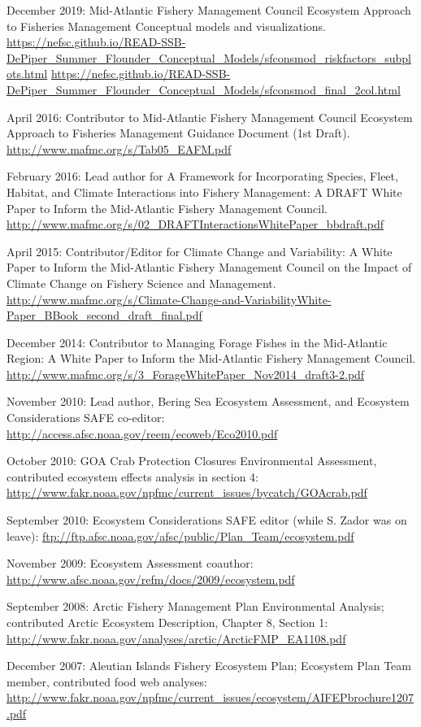\documentclass[11pt, a4paper]{awesome-cv}
\begin{document}
December 2019: Mid-Atlantic Fishery Management Council Ecosystem
Approach to Fisheries Management Conceptual models and visualizations.
\url{https://nefsc.github.io/READ-SSB-DePiper_Summer_Flounder_Conceptual_Models/sfconsmod_riskfactors_subplots.html}
\url{https://nefsc.github.io/READ-SSB-DePiper_Summer_Flounder_Conceptual_Models/sfconsmod_final_2col.html}

April 2016: Contributor to Mid-Atlantic Fishery Management Council
Ecosystem Approach to Fisheries Management Guidance Document (1st
Draft). \url{http://www.mafmc.org/s/Tab05_EAFM.pdf}

February 2016: Lead author for A Framework for Incorporating Species,
Fleet, Habitat, and Climate Interactions into Fishery Management: A
DRAFT White Paper to Inform the Mid-Atlantic Fishery Management Council.
\url{http://www.mafmc.org/s/02_DRAFTInteractionsWhitePaper_bbdraft.pdf}

April 2015: Contributor/Editor for Climate Change and Variability: A
White Paper to Inform the Mid-Atlantic Fishery Management Council on the
Impact of Climate Change on Fishery Science and Management.
\url{http://www.mafmc.org/s/Climate-Change-and-VariabilityWhite-Paper_BBook_second_draft_final.pdf}

December 2014: Contributor to Managing Forage Fishes in the Mid-Atlantic
Region: A White Paper to Inform the Mid-Atlantic Fishery Management
Council.
\url{http://www.mafmc.org/s/3_ForageWhitePaper_Nov2014_draft3-2.pdf}

November 2010: Lead author, Bering Sea Ecosystem Assessment, and
Ecosystem Considerations SAFE co-editor:
\url{http://access.afsc.noaa.gov/reem/ecoweb/Eco2010.pdf}

October 2010: GOA Crab Protection Closures Environmental Assessment,
contributed ecosystem effects analysis in section 4:
\url{http://www.fakr.noaa.gov/npfmc/current_issues/bycatch/GOAcrab.pdf}

September 2010: Ecosystem Considerations SAFE editor (while S. Zador was
on leave):
\url{ftp://ftp.afsc.noaa.gov/afsc/public/Plan_Team/ecosystem.pdf}

November 2009: Ecosystem Assessment coauthor:
\url{http://www.afsc.noaa.gov/refm/docs/2009/ecosystem.pdf}

September 2008: Arctic Fishery Management Plan Environmental Analysis;
contributed Arctic Ecosystem Description, Chapter 8, Section 1:
\url{http://www.fakr.noaa.gov/analyses/arctic/ArcticFMP_EA1108.pdf}

December 2007: Aleutian Islands Fishery Ecosystem Plan; Ecosystem Plan
Team member, contributed food web analyses:
\url{http://www.fakr.noaa.gov/npfmc/current_issues/ecosystem/AIFEPbrochure1207.pdf}
\end{document}

